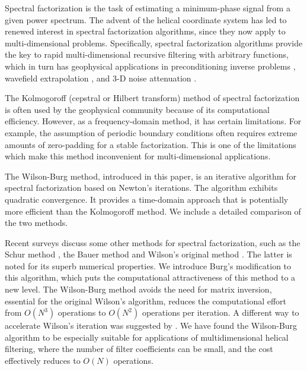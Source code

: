Spectral factorization is the task of estimating a minimum-phase signal from a
given power spectrum. The advent of the helical coordinate system
\cite{helix0,helix} has led to renewed interest in spectral factorization
algorithms, since they now apply to multi-dimensional problems. Specifically,
spectral factorization algorithms provide the key to rapid multi-dimensional
recursive filtering with arbitrary functions, which in turn has geophysical
applications in preconditioning inverse problems \cite{SEG-1998-1851,precon},
wavefield extrapolation
\cite{SEG-1998-1124,EAE-2000-P0145,SEG-2000-08620865,SEG-2001-10571060}, and
3-D noise attenuation \cite{SEG-1999-12311234,EAE-1999-6039,EAE-2001-P167}.

The Kolmogoroff (cepstral or Hilbert transform) method of spectral
factorization \cite{kolmog,Claerbout.fgdp.76,oppenheim} is often used by the
geophysical community because of its computational efficiency. However, as a
frequency-domain method, it has certain limitations. For example, the
assumption of periodic boundary conditions often requires extreme amounts of
zero-padding for a stable factorization. This is one of the limitations which
make this method inconvenient for multi-dimensional applications.

The Wilson-Burg method, introduced in this paper, is an iterative algorithm
for spectral factorization based on Newton's iterations. The algorithm
exhibits quadratic convergence. It provides a time-domain approach that is
potentially more efficient than the Kolmogoroff method. We include a detailed
comparison of the two methods.

Recent surveys \cite{goodman,kailath} discuss some other methods for spectral
factorization, such as the Schur method \cite{schur}, the Bauer method
\cite{bauer} and Wilson's original method \cite{mywilson}. The latter is noted
for its superb numerical properties. We introduce Burg's modification to this
algorithm, which puts the computational attractiveness of this method to a new
level. The Wilson-Burg method avoids the need for matrix inversion, essential
for the original Wilson's algorithm, reduces the computational effort from
$O(N^3)$ operations to $O(N^2)$ operations per iteration. A different way to
accelerate Wilson's iteration was suggested by . We have
found the Wilson-Burg algorithm to be especially suitable for applications of
multidimensional helical filtering, where the number of filter coefficients
can be small, and the cost effectively reduces to $O(N)$ operations.

